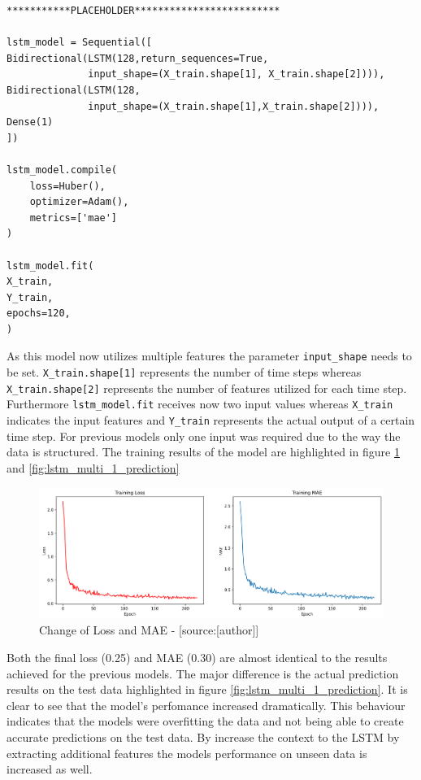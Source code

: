 \begin{lstlisting}
***********PLACEHOLDER*************************

lstm_model = Sequential([
Bidirectional(LSTM(128,return_sequences=True,
			  input_shape=(X_train.shape[1], X_train.shape[2]))),
Bidirectional(LSTM(128,
			  input_shape=(X_train.shape[1],X_train.shape[2]))),
Dense(1)
])

lstm_model.compile(
    loss=Huber(),
    optimizer=Adam(),
    metrics=['mae']
)

lstm_model.fit(
X_train, 
Y_train, 
epochs=120, 
)
\end{lstlisting}
As this model now utilizes multiple features the parameter \verb|input_shape| needs to be set.  \verb|X_train.shape[1]| represents the number of time steps whereas \verb|X_train.shape[2]| represents the number of features utilized for each time step. Furthermore \verb|lstm_model.fit| receives now two input values whereas \verb|X_train| indicates the input features and \verb|Y_train| represents the actual output of a certain time step. For previous models only one input was required due to the way the data is structured. 
The training results of the model are highlighted in figure \ref{fig:lstm_multi_1_mae} and \ref{fig:lstm_multi_1_prediction} 
\begin{figure}[H]
	\centering
		\includegraphics[width=12cm]{images/lstm_multi_1_mae}
	\caption{Change of Loss and MAE - [source:[author]]}
	\label{fig:lstm_multi_1_mae}
\end{figure}
Both the final loss (0.25) and MAE (0.30) are almost identical to the results achieved for the previous models. The major difference is the actual prediction results on the test data highlighted in figure  \ref{fig:lstm_multi_1_prediction}. It is clear to see that the model's perfomance increased dramatically. This behaviour indicates that the models were overfitting the data and not being able to create accurate predictions on the test data. By increase the context to the LSTM by extracting additional features the models performance on unseen data is increased as well. 
